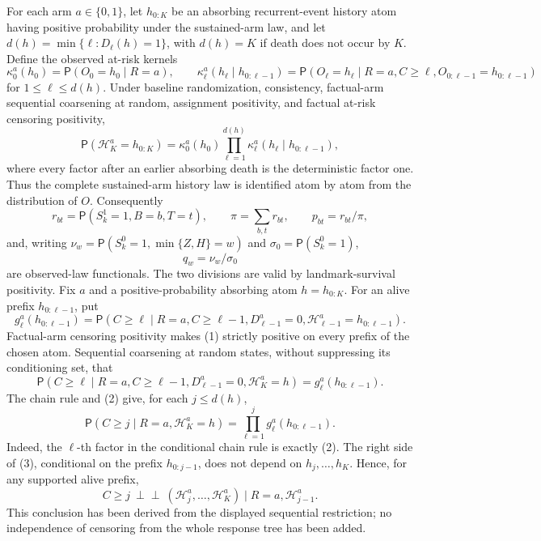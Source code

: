 For each arm \(a\in\{0,1\}\), let \(h_{0:K}\) be an absorbing recurrent-event history atom having positive probability under the sustained-arm law, and let \(d(h)=\min\{\ell:D_\ell(h)=1\}\), with \(d(h)=K\) if death does not occur by \(K\).  Define the observed at-risk kernels
\[
 \kappa_0^a(h_0)=\mathsf P(O_0=h_0\mid R=a),
 \qquad
 \kappa_\ell^a(h_\ell\mid h_{0:\ell-1})
 =\mathsf P(O_\ell=h_\ell\mid R=a,C\ge\ell,
                    O_{0:\ell-1}=h_{0:\ell-1})
\]
for \(1\le\ell\le d(h)\).  Under baseline randomization, consistency, factual-arm sequential coarsening at random, assignment positivity, and factual at-risk censoring positivity,
\[
 \mathsf P(\mathcal H_K^a=h_{0:K})
 =\kappa_0^a(h_0)
   \prod_{\ell=1}^{d(h)}
       \kappa_\ell^a(h_\ell\mid h_{0:\ell-1}),
\]
where every factor after an earlier absorbing death is the deterministic factor one.  Thus the complete sustained-arm history law is identified atom by atom from the distribution of \(O\).  Consequently
\[
 r_{bt}=\mathsf P(S_k^1=1,B=b,T=t),\qquad
 \pi=\sum_{b,t}r_{bt},\qquad p_{bt}=r_{bt}/\pi,
\]
and, writing \(\nu_w=\mathsf P(S_k^0=1,\min\{Z,H\}=w)\) and
\(\sigma_0=\mathsf P(S_k^0=1)\),
\[
 q_w=\nu_w/\sigma_0
\]
are observed-law functionals.  The two divisions are valid by landmark-survival positivity.
Fix \(a\) and a positive-probability absorbing atom \(h=h_{0:K}\).  For an alive prefix \(h_{0:\ell-1}\), put
\[
 g_\ell^a(h_{0:\ell-1})
 =\mathsf P(C\ge\ell\mid R=a,C\ge\ell-1,
       D_{\ell-1}^a=0,\mathcal H_{\ell-1}^a=h_{0:\ell-1}).       \tag{1}
\]
Factual-arm censoring positivity makes (1) strictly positive on every prefix of the chosen atom.  Sequential coarsening at random states, without suppressing its conditioning set, that
\[
 \mathsf P(C\ge\ell\mid R=a,C\ge\ell-1,D_{\ell-1}^a=0,
                  \mathcal H_K^a=h)
 =g_\ell^a(h_{0:\ell-1}).                                  \tag{2}
\]
The chain rule and (2) give, for each \(j\le d(h)\),
\[
 \mathsf P(C\ge j\mid R=a,\mathcal H_K^a=h)
 =\prod_{\ell=1}^{j}g_\ell^a(h_{0:\ell-1}).                \tag{3}
\]
Indeed, the \(\ell\)-th factor in the conditional chain rule is exactly (2).  The right side of (3), conditional on the prefix \(h_{0:j-1}\), does not depend on \(h_j,\ldots,h_K\).  Hence, for any supported alive prefix,
\[
 C\ge j\ \perp\!\!\!\perp\
 (\mathcal H_j^a,\ldots,\mathcal H_K^a)
 \mid R=a,\mathcal H_{j-1}^a.                              \tag{4}
\]
This conclusion has been derived from the displayed sequential restriction; no independence of censoring from the whole response tree has been added.

